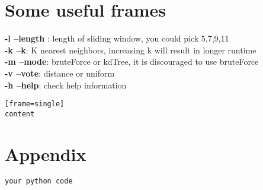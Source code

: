 \documentclass{article}
\begin{document}
\section{Some useful frames}
\begin{mdframed}[backgroundcolor=black!10]
\textbf{-l --length} : length of sliding window, you could pick 5,7,9,11 \\
\textbf{-k --k}: K nearest neighbors, increasing k will result in longer runtime \\
\textbf{-m --mode}: bruteForce or kdTree, it is discouraged to use bruteForce \\
\textbf{-v --vote}: distance or uniform \\
\textbf{-h --help}: check help information 
\end{mdframed}

\begin{verbatim}[frame=single]
content
\end{verbatim}


\section{Appendix}
\begin{lstlisting}[language=Python, caption=Python Code]
your python code
\end{lstlisting}
\end{document}
